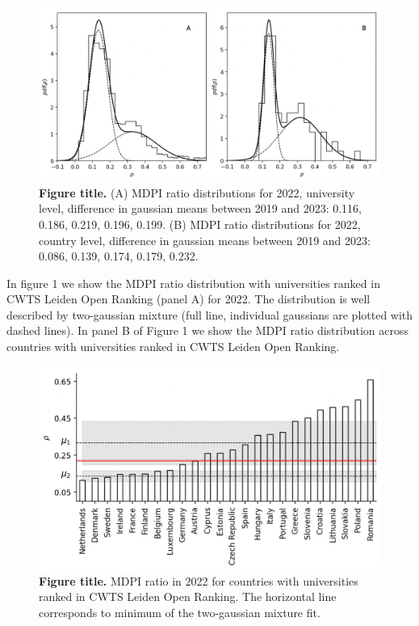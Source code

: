 \documentclass[amsfonts, amssymb, prl, superscriptaddress, notitlepage, twocolumn, nofootinbib]{revtex4-2}
\begin{document}
\begin{figure}
\centering
\includegraphics[width=1.0\linewidth]{Fig01f.png}
\caption{\label{fig:fig1} {\bf Figure title.} (A) MDPI ratio distributions for 2022, university level, difference in gaussian means between 2019 and 2023: 0.116, 0.186, 0.219, 0.196, 0.199. (B) MDPI ratio distributions for 2022, country level, difference in gaussian means between 2019 and 2023: 0.086, 0.139, 0.174, 0.179, 0.232.
}
\end{figure}

In figure 1 we show the MDPI ratio distribution with universities ranked in CWTS Leiden Open Ranking (panel A) for 2022. The distribution is well described by two-gaussian mixture (full line, individual gaussians  are plotted with dashed lines). In panel B of Figure 1 we show the MDPI ratio distribution across countries with universities ranked in CWTS Leiden Open Ranking.

\begin{figure}
    \centering
    \includegraphics[width=1.0\linewidth]{Fig01af.png}
    \caption{\label{fig:fig2} {\bf Figure title.} MDPI ratio in 2022 for countries with universities ranked in CWTS Leiden Open Ranking. The horizontal line corresponds to minimum of the two-gaussian mixture fit.
    }
    \end{figure}
\end{document}
